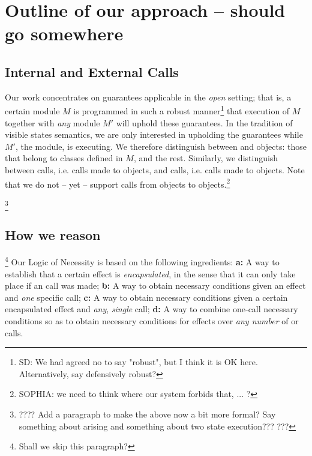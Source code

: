\section{Outline of our approach -- should go somewhere}

\subsection{Internal and External Calls} 
Our work concentrates on guarantees applicable in the \emph{open} setting; that is, a certain module
$M$ is programmed in such a robust manner\footnote{SD: We had agreed no to say "robust", but I think it is OK here. Alternatively, say defensively robust?} that execution of $M$ together with \emph{any} \externalM 
module $M'$ will uphold these guarantees. In the tradition of
visible states semantics, we are  only interested in upholding the guarantees while 
$M'$, the  \externalM module,  is executing.   
 We therefore distinguish between \emph{\internalO} and
\emph{\externalO} objects: those that belong to classes defined in $M$, and the rest. Similarly, we 
distinguish between \emph{\internalC} calls, i.e. calls made %
 to \internalO objects, and \emph{\externalC} calls, i.e. calls made %
 to \externalC objects. %
Note that we do not -- yet -- support calls from
\internalO objects to \externalO objects.\footnote{SOPHIA: we need to think where our system forbids that, ... ?}

\footnote{???? Add a paragraph to make the above now a bit more formal? Say something about arising and something about two state execution??? ???}

\subsection{How we reason}

\footnote{Shall we skip this paragraph?} Our Logic of Necessity is based on the following ingredients: 
\textbf{a:} A  %
way to  establish that a certain effect is \emph{encapsulated}, in the 
sense that it can only take place if an \internalC call was made; 
\textbf{b:} A way to obtain necessary conditions given an effect and \emph{one}
 specific \internalC call;
\textbf{c:} A way to obtain necessary conditions given a certain encapsulated effect and \emph{any},
\emph{single} \internalC call;
\textbf{d:} A way to combine one-call   necessary conditions  so as to obtain necessary conditions 
for effects over 
\emph{any number} of \internalC or \externalC calls.

